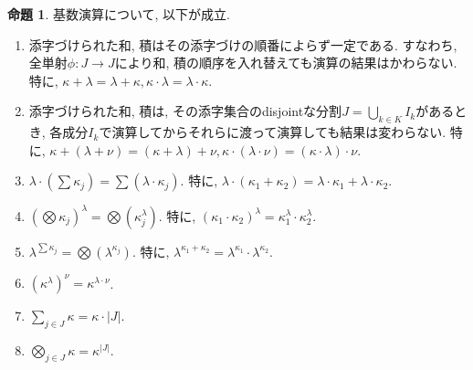 \documentclass[a4paper, twoside]{bxjsarticle}
\newcommand{\abs}[1]{\left\lvert#1\right\rvert}
\theoremstyle{definition}
\newtheorem{prop}[thm]{命題}
\begin{document}
        \begin{prop}
            基数演算について, 以下が成立.
            \begin{enumerate}
                \item 添字づけられた和, 積はその添字づけの順番によらず一定である. すなわち, 全単射$\phi\colon J\to J$により和, 積の順序を入れ替えても演算の結果はかわらない. 特に, $\kappa+\lambda=\lambda+\kappa, \kappa\cdot\lambda=\lambda\cdot\kappa$.
                \item 添字づけられた和, 積は, その添字集合のdisjointな分割$J=\bigcup_{k\in K} I_k$があるとき, 各成分$I_k$で演算してからそれらに渡って演算しても結果は変わらない. 特に, $\kappa+(\lambda+\nu)=(\kappa+\lambda)+\nu, \kappa\cdot(\lambda\cdot\nu)=(\kappa\cdot\lambda)\cdot\nu$.
                \item $\lambda\cdot(\sum\kappa_j)=\sum(\lambda\cdot\kappa_j)$. 特に, $\lambda\cdot(\kappa_1+\kappa_2)=\lambda\cdot\kappa_1+\lambda\cdot\kappa_2$.
                \item $(\bigotimes\kappa_j)^\lambda=\bigotimes(\kappa_j^\lambda)$. 特に, $(\kappa_1\cdot\kappa_2)^\lambda=\kappa_1^\lambda\cdot\kappa_2^\lambda$.
                \item $\lambda^{\sum\kappa_j}=\bigotimes(\lambda^{\kappa_j})$. 特に, $\lambda^{\kappa_1+\kappa_2}=\lambda^{\kappa_1}\cdot\lambda^{\kappa_2}$.
                \item $(\kappa^\lambda)^\nu=\kappa^{\lambda\cdot\nu}$.
                \item $\sum_{j\in J}\kappa=\kappa\cdot\abs{J}$.
                \item $\bigotimes_{j\in J}\kappa=\kappa^{\abs{J}}$.
            \end{enumerate}
        \end{prop}
\end{document}

